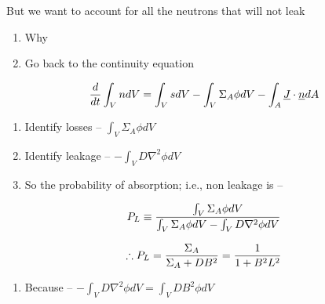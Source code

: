 \documentclass[aspectratio=1610,pdftex,dvipsnames,compress,xcolor={dvipsnames}]{beamer}
\begin{document}
\begin{frame}{But we want to account for all the neutrons that will not leak}
    \begin{enumerate}[series=outerlist,topsep=0pt,itemsep=11pt,leftmargin=*,label=(\arabic*)]
        \item[]Why
        \item[]Go back to the continuity equation
    \end{enumerate}

    \vspace*{\fill}

    \begin{equation}
        \small
        \frac{d}{dt} \int_V n dV =
        \int_V s dV - \int_V \Sigma_A \phi dV - \int_A \underline{J} \cdot \underline{n} dA
    \end{equation}

    \vspace*{\fill}

    \begin{enumerate}[series=outerlist,topsep=0pt,itemsep=11pt,leftmargin=*,label=(\arabic*)]
        \item[]Identify losses -- $\int_V \Sigma_A \phi dV$
        \item[]Identify leakage -- $- \int_V D \nabla^2 \phi dV$
        \item[]So the probability of absorption; i.e., non leakage is --
    \end{enumerate}

    \vspace*{\fill}

    \begin{equation}
        \small
        P_L \equiv \frac{\int_V \Sigma_A \phi dV}{\int_V \Sigma_A \phi dV - \int_V D \nabla^2 \phi dV}
    \end{equation}

    \begin{equation}
        \small
        \therefore P_L = \frac{\Sigma_A}{\Sigma_A + D B^2} = \frac{1}{1+B^2L^2}
    \end{equation}

    \vspace*{\fill}

    \begin{enumerate}[series=outerlist,topsep=0pt,itemsep=11pt,leftmargin=*,label=(\arabic*)]
        \item[]Because -- $- \int_V D \nabla^2 \phi dV = \int_V DB^2 \phi dV$
    \end{enumerate}
\end{frame}
\end{document}
